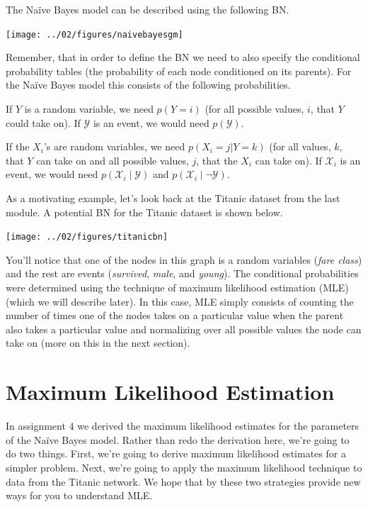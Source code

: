\documentclass{tufte-handout}
\begin{document}
The Na\"ive Bayes model can be described using the following BN.

\begin{center}
\texttt{[image: ../02/figures/naivebayesgm]}
\end{center}

Remember, that in order to define the BN we need to also specify the conditional probability tables (the probability of each node conditioned on its parents).  For the Na\"ive Bayes model this consists of the following probabilities.

\bi
\item If $Y$ is a random variable, we need $p(Y=i)$ (for all possible values, $i$, that $Y$ could take on).  If $\mathcal{Y}$ is an event, we would need $p(\mathcal{Y})$.
\item If the $X_i$'s are random variables, we need $p(X_i=j | Y=k)$ (for all values, $k$, that $Y$ can take on and all possible values, $j$, that the $X_i$ can take on).  If $\mathcal{X}_i$ is an event, we would need $p(\mathcal{X}_i \mid \mathcal{Y})$ and $p(\mathcal{X}_i \mid \neg \mathcal{Y})$.
\ei

As a motivating example, let's look back at the Titanic dataset from the last module.  A potential BN for the Titanic dataset is shown below.

\begin{center}
\texttt{[image: ../02/figures/titanicbn]}
\end{center}

You'll notice that one of the nodes in this graph is a random variables (\emph{fare class}) and the rest are events (\emph{survived}, \emph{male}, and \emph{young}).  The conditional probabilities were determined using the technique of maximum likelihood estimation (MLE) (which we will describe later).  In this case, MLE simply consists of counting the number of times one of the nodes takes on a particular value when the parent also takes a particular value and normalizing over all possible values the node can take on (more on this in the next section).

\section{Maximum Likelihood Estimation}

In assignment 4 we derived the maximum likelihood estimates for the parameters of the Na\"ive Bayes model.  Rather than redo the derivation here, we're going to do two things.  First, we're going to derive maximum likelihood estimates for a simpler problem.  Next, we're going to apply the maximum likelihood technique to data from the Titanic network.  We hope that by these two strategies provide new ways for you to understand MLE.
\end{document}
